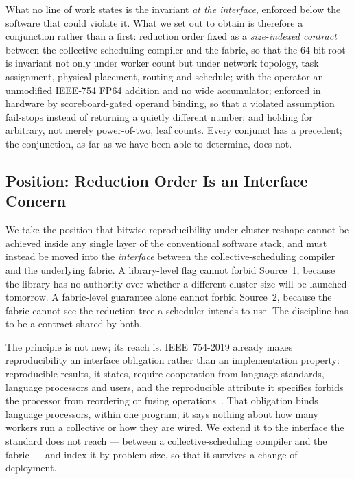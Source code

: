 \documentclass[journal,10pt]{IEEEtran}
\theoremstyle{plain}
\theoremstyle{definition}
\theoremstyle{remark}
\begin{document}
What no line of work states is the invariant \emph{at the interface},
enforced below the software that could violate it. What we set out to obtain
is therefore a conjunction rather than a first: reduction order fixed as a
\emph{size-indexed contract} between the collective-scheduling compiler and
the fabric, so that the 64-bit root is invariant not only under worker count
but under network topology, task assignment, physical placement, routing and
schedule; with the operator an unmodified IEEE-754 FP64 addition and no wide
accumulator; enforced in hardware by scoreboard-gated operand binding, so
that a violated assumption fail-stops instead of returning a quietly
different number; and holding for arbitrary, not merely power-of-two, leaf
counts. Every conjunct has a precedent; the conjunction, as far as we have
been able to determine, does not.

\subsection{Position: Reduction Order Is an Interface Concern}

We take the position that bitwise reproducibility under cluster reshape
cannot be achieved inside any single layer of the conventional software
stack, and must instead be moved into the \emph{interface} between the
collective-scheduling compiler and the underlying fabric.  A library-level
flag cannot forbid Source~1, because the library has no authority over
whether a different cluster size will be launched tomorrow.  A fabric-level
guarantee alone cannot forbid Source~2, because the fabric cannot see the
reduction tree a scheduler intends to use. The discipline has to be a
contract shared by both.

The principle is not new; its reach is. IEEE~754-2019 already makes
reproducibility an interface obligation rather than an implementation
property: reproducible results, it states, require cooperation from language
standards, language processors and users, and the reproducible attribute it
specifies forbids the processor from reordering or fusing
operations~\cite{ieee754-2019}. That obligation binds language processors,
within one program; it says nothing about how many workers run a collective
or how they are wired. We extend it to the interface the standard does not
reach --- between a collective-scheduling compiler and the fabric --- and
index it by problem size, so that it survives a change of deployment.
\end{document}
